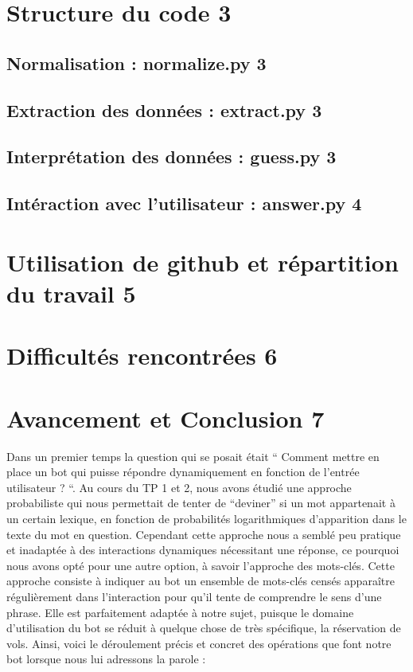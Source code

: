 \documentclass[]{article}
\begin{document}
\Huge{\textbf{\color{title}{Sommaire}}}
\bigskip
\bigskip

\section{Structure du code \hfill 3}
\subsection{Normalisation : normalize.py \hfill 3}
\subsection{Extraction des données : extract.py \hfill 3}
\subsection{Interprétation des données : guess.py \hfill 3}
\subsection{Intéraction avec l’utilisateur : answer.py \hfill 4}
\section{Utilisation de github et répartition du travail \hfill 5}
\section{Difficultés rencontrées \hfill 6}
\section{Avancement et Conclusion \hfill 7}


\newpage
\Huge{\textbf{\color{title}{I) Structure du code}}}

\bigskip
\bigskip

\large{
Dans un premier temps la question qui se posait était “ Comment mettre en place un bot qui puisse répondre dynamiquement en fonction de l’entrée utilisateur ? “. Au cours du TP 1 et 2, nous avons étudié une approche probabiliste qui nous permettait de tenter de “deviner” si un mot appartenait à un certain lexique, en fonction de probabilités logarithmiques d’apparition dans le texte du mot en question.
Cependant cette approche nous a semblé peu pratique et inadaptée à des interactions dynamiques nécessitant une réponse, ce pourquoi nous avons opté pour une autre option, à savoir l’approche des mots-clés. 
Cette approche consiste à indiquer au bot un ensemble de mots-clés censés apparaître régulièrement dans l'interaction pour qu’il tente de comprendre le sens d’une phrase. Elle est parfaitement adaptée à notre sujet, puisque le domaine d’utilisation du bot se réduit à quelque chose de très spécifique, la réservation de vols.
Ainsi, voici le déroulement précis et concret des opérations que font notre bot lorsque nous lui adressons la parole :
}
\bigskip
\end{document}
